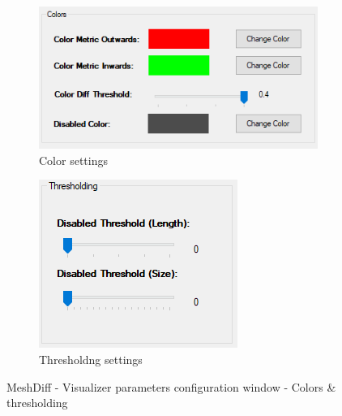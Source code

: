 \begin{figure}[h]
	\centering
	\begin{subfigure}{0.6\textwidth}
		\includegraphics[width=\textwidth]{./img/meshdiff-visualizer_parameters-colors.PNG}
		\caption{Color settings}
		\label{fig:meshdiff-visualizer_parameters_colors}
	\end{subfigure}
	\qquad
	\begin{subfigure}{0.3\textwidth}
		\includegraphics[width=\textwidth]{./img/meshdiff-visualizer_parameters-thresholding.PNG}
		\caption{Thresholdng settings}
		\label{fig:meshdiff-visualizer_parameters_thresholding}
	\end{subfigure}
	\caption[MeshDiff - Visualizer parameters - Colors \& thresholding]{MeshDiff - Visualizer parameters configuration window - Colors \& thresholding}
\end{figure}


